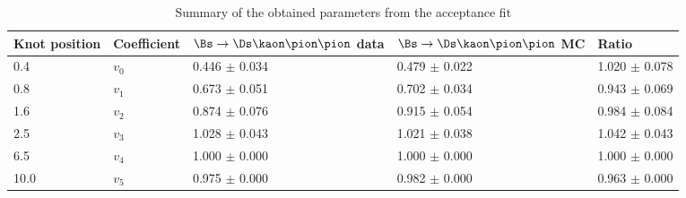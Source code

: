 \begin{table}[h]
\centering
\caption{Summary of the obtained parameters from the acceptance fit} 
\begin{tabular}{l l l l l}
\hline
\hline
Knot position & Coefficient & $\Bs\to\Ds\kaon\pion\pion$ data & $\Bs\to\Ds\kaon\pion\pion$ MC & Ratio \\
\hline
0.4 & $v_{0}$ & 0.446 $\pm$ 0.034 & 0.479 $\pm$ 0.022 & 1.020 $\pm$ 0.078\\
0.8 & $v_{1}$ & 0.673 $\pm$ 0.051 & 0.702 $\pm$ 0.034 & 0.943 $\pm$ 0.069\\
1.6 & $v_{2}$ & 0.874 $\pm$ 0.076 & 0.915 $\pm$ 0.054 & 0.984 $\pm$ 0.084\\
2.5 & $v_{3}$ & 1.028 $\pm$ 0.043 & 1.021 $\pm$ 0.038 & 1.042 $\pm$ 0.043\\
6.5 & $v_{4}$ & 1.000 $\pm$ 0.000 & 1.000 $\pm$ 0.000 & 1.000 $\pm$ 0.000\\
10.0 & $v_{5}$ & 0.975 $\pm$ 0.000 & 0.982 $\pm$ 0.000 & 0.963 $\pm$ 0.000\\
\hline
\hline
\end{tabular}
\label{table:splines}
\end{table}
